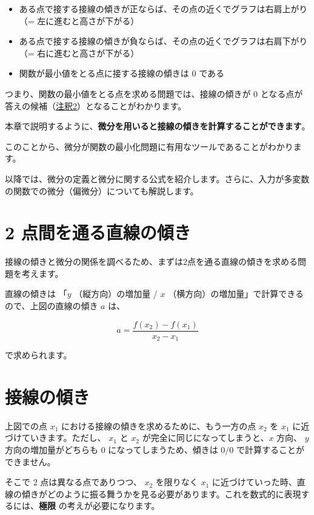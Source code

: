 \begin{itemize}
\item ある点で接する接線の傾きが正ならば、その点の近くでグラフは右肩上がり（= 左に進むと高さが下がる）
\item ある点で接する接線の傾きが負ならば、その点の近くでグラフは右肩下がり（= 右に進むと高さが下がる）
\item 関数が最小値をとる点に接する接線の傾きは $0$ である
\end{itemize}


つまり、関数の最小値をとる点を求める問題では、接線の傾きが $0$ となる点が答えの候補（\hyperref[04-basics-of-differential-note2]{注釈2}）となることがわかります。

本章で説明するように、\textbf{微分を用いると接線の傾きを計算することができます}。

このことから、微分が関数の最小化問題に有用なツールであることがわかります。


以降では、微分の定義と微分に関する公式を紹介します。さらに、入力が多変数の関数での微分（偏微分）についても解説します。


\section{2 点間を通る直線の傾き}


接線の傾きと微分の関係を調べるため、まずは2点を通る直線の傾きを求める問題を考えます。




直線の傾きは 「$y$ （縦方向）の増加量 / $x$ （横方向）の増加量」で計算できるので、上図の直線の傾き $a$ は、


\[
a = \dfrac{f(x_{2}) - f(x_{1})}{x_{2}-x_{1}}
\]


で求められます。


\section{接線の傾き}


上図での点 $x_1$ における接線の傾きを求めるために、もう一方の点 $x_2$ を $x_1$ に近づけていきます。ただし、 $x_1$ と $x_2$ が完全に同じになってしまうと、$x$ 方向、 $y$ 方向の増加量がどちらも $0$ になってしまうため、傾きは $0/0$ で計算することができません。

そこで 2 点は異なる点でありつつ、 $x_2$ を限りなく $x_1$ に近づけていった時、直線の傾きがどのように振る舞うかを見る必要があります。これを数式的に表現するには、\textbf{極限} の考えが必要になります。



